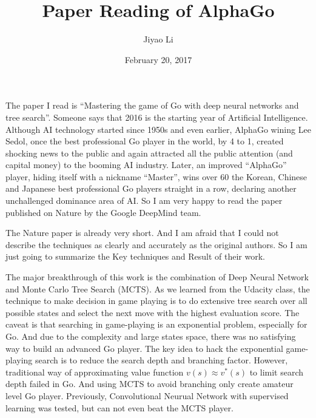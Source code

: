 \documentclass[11pt, letterpaper]{article}
\title{Paper Reading of AlphaGo}
\author{Jiyao Li}
\date{February 20, 2017}
\begin{document}
	\maketitle 
	
The paper I read is ``Mastering the game of Go with deep neural networks and tree search''. Someone says that 2016 is the starting year of Artificial Intelligence. Although AI technology started since 1950s and even earlier, AlphaGo wining Lee Sedol, once the best professional Go player in the world, by 4 to 1, created shocking news to the public and again attracted all the public attention (and capital money) to the booming AI industry. Later, an improved ``AlphaGo'' player, hiding itself with a nickname ``Master'', wins over 60 the Korean, Chinese and Japanese best professional Go players straight in a row, declaring another unchallenged dominance area of AI. So I am very happy to read the paper published on Nature by the Google DeepMind team. 

The Nature paper is already very short. And I am afraid that I could not describe the techniques as clearly and accurately as the original authors. So I am just going to summarize the Key techniques and Result of their work. 

The major breakthrough of this work is the combination of Deep Neural Network and Monte Carlo Tree Search (MCTS). As we learned from the Udacity class, the technique to make decision in game playing is to do extensive tree search over all possible states and select the next move with the highest evaluation score. The caveat is that searching in game-playing is an exponential problem, especially for Go. And due to the complexity and large states space, there was no satisfying way to build an advanced Go player. The key idea to hack the exponential game-playing search is to reduce the search depth and branching factor. However, traditional way of approximating value function $v(s)\approx v^*(s)$ to limit search depth failed in Go. And using MCTS to avoid branching only create amateur level Go player. Previously, Convolutional Neurual Network with supervised learning was tested, but can not even beat the MCTS player. 
\end{document}
